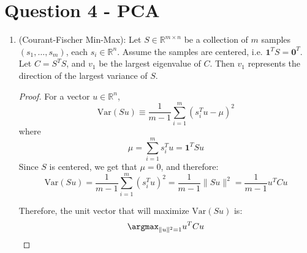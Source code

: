 \documentclass{article}
\begin{document}
\section*{Question 4 - PCA}
\begin{enumerate}[label=\textbf{\large\arabic*)}]

  \item 
\begin{claim}
(Courant-Fischer Min-Max): Let $S \in \mathbb{R}^{m \times n}$ be a collection of $m$ samples $(s_1, \ldots, s_m)$, each $s_i \in \mathbb{R}^{n}$. 
  Assume the samples are centered, i.e. $\bm{1}^{T} S = \bm{0}^{T}$.  
Let $C = S ^{T}S$, and $v_1$ be the largest eigenvalue of $C$. Then $v_1$ represents the direction of the largest variance of $S$. 
\end{claim}

\begin{proof} For a vector $u \in \mathbb{R}^{n}$, 
\[
  \text{Var}(Su) \equiv \frac{1}{m-1} \sum_{i=1}^{m} (s_i ^{T} u- \mu) ^2
\]
    where
    \[
      \mu = \sum_{i=1}^{m} s_i ^{T} u = \bm{1}^{T}Su
    \]
   Since $S$ is centered, we get that $\mu=0$, and therefore:
    \[
      \text{Var}(Su) = \frac{1}{m-1} \sum_{i=1}^{m} (s_i ^{T} u) ^2 = \frac{1}{m-1} \lVert Su \rVert ^2 = \frac{1}{m-1} u ^{T} C u
    \]
    

    Therefore, the unit vector that will maximize $\text{Var}(Su)$ is: 
    \[
      \argmax_{\lVert u \rVert ^2 =1} u^{T} C u
    \]
    


\end{proof}
\end{enumerate}
\end{document}
